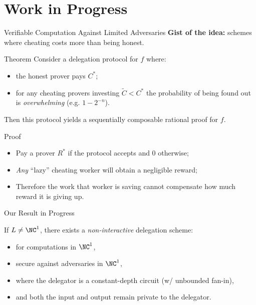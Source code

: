 \section{Work in Progress}


\begin{frame}{Verifiable Computation Against Limited Adversaries}
	\textbf{Gist of the idea:} schemes where cheating costs more than being honest.
	\onslide<+->
	
	\begin{block}{Theorem}
		Consider a delegation protocol for $f$ where:
		\begin{itemize}
			\item the honest prover pays $C^*$;
			\item for any cheating provers investing $\tilde{C} < C^*$ the probability of being found out is \textit{overwhelming} (e.g. $1-2^{-n}$).
		\end{itemize}
		Then this protocol yields a sequentially composable rational proof for $f$.
	\end{block}
	\pause
	\begin{block}{Proof}
		
		\begin{itemize}[<+- | alert@+>]	
			\item Pay a prover $R^*$ if the protocol accepts and 0 otherwise;
			\item \textit{Any} ``lazy'' cheating worker will obtain a negligible reward;
			\item Therefore the work that worker is saving cannot compensate how much reward it is giving up.
		\end{itemize}
	\end{block}
\end{frame}

\begin{frame}{Our Result in Progress}
\begin{block}{}
	\label{res:delegation}
	If $L \not = \NC^1$, there exists a \textit{non-interactive} delegation scheme:
	\begin{itemize}[<+- | alert@+>]	
		\item for computations in $\NC^1$,
		\item secure against adversaries in $\NC^1$,
		\item where the delegator is a constant-depth circuit (w/ unbounded fan-in),
		\item and both the input and output remain private to the delegator.
	\end{itemize} 
\end{block}
\end{frame}

